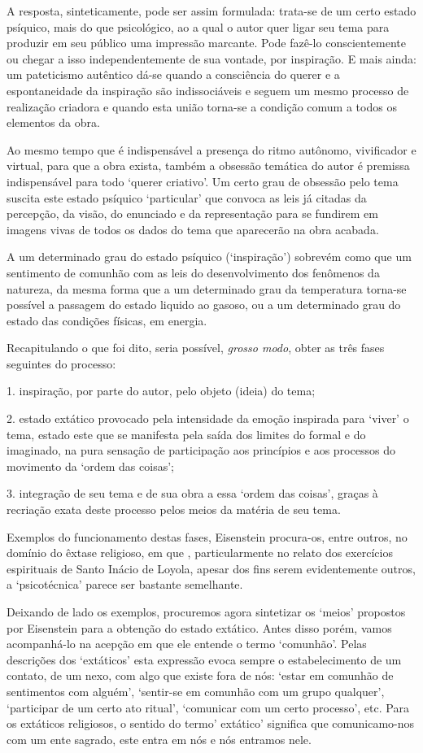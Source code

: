 A resposta, sinteticamente, pode ser assim formulada: trata-se de um
certo estado psíquico, mais do que psicológico, ao a qual o autor quer
ligar seu tema para produzir em seu público uma impressão marcante. Pode
fazê-lo conscientemente ou chegar a isso independentemente de sua
vontade, por inspiração. E mais ainda: um pateticismo autêntico dá-se
quando a consciência do querer e a espontaneidade da inspiração são
indissociáveis e seguem um mesmo processo de realização criadora e
quando esta união torna-se a condição comum a todos os elementos da
obra.

Ao mesmo tempo que é indispensável a presença do ritmo autônomo,
vivificador e virtual, para que a obra exista, também a obsessão
temática do autor é premissa indispensável para todo `querer criativo'.
Um certo grau de obsessão pelo tema suscita este estado psíquico
`particular' que convoca as leis já citadas da percepção, da visão, do
enunciado e da representação para se fundirem em imagens vivas de todos
os dados do tema que aparecerão na obra acabada.

A um determinado grau do estado psíquico (`inspiração') sobrevém como
que um sentimento de comunhão com as leis do desenvolvimento dos
fenômenos da natureza, da mesma forma que a um determinado grau da
temperatura torna-se possível a passagem do estado liquido ao gasoso, ou
a um determinado grau do estado das condições físicas, em energia.

Recapitulando o que foi dito, seria possível, \emph{grosso modo}, obter
as três fases seguintes do processo:

1. inspiração, por parte do autor, pelo objeto (ideia) do tema;

2. estado extático provocado pela intensidade da emoção inspirada para
`viver' o tema, estado este que se manifesta pela saída dos limites do
formal e do imaginado, na pura sensação de participação aos princípios e
aos processos do movimento da `ordem das coisas';

3. integração de seu tema e de sua obra a essa `ordem das coisas',
graças à recriação exata deste processo pelos meios da matéria de seu
tema.

Exemplos do funcionamento destas fases, Eisenstein procura-os, entre
outros, no domínio do êxtase religioso, em que , particularmente no
relato dos exercícios espirituais de Santo Inácio de Loyola, apesar dos
fins serem evidentemente outros, a `psicotécnica' parece ser bastante
semelhante.

Deixando de lado os exemplos, procuremos agora sintetizar os `meios'
propostos por Eisenstein para a obtenção do estado extático. Antes disso
porém, vamos acompanhá-lo na acepção em que ele entende o termo
`comunhão'. Pelas descrições dos `extáticos' esta expressão evoca sempre
o estabelecimento de um contato, de um nexo, com algo que existe fora de
nós: `estar em comunhão de sentimentos com alguém', `sentir-se em
comunhão com um grupo qualquer', `participar de um certo ato ritual',
`comunicar com um certo processo', etc. Para os extáticos religiosos, o
sentido do termo' extático' significa que comunicamo-nos com um ente
sagrado, este entra em nós e nós entramos nele.

